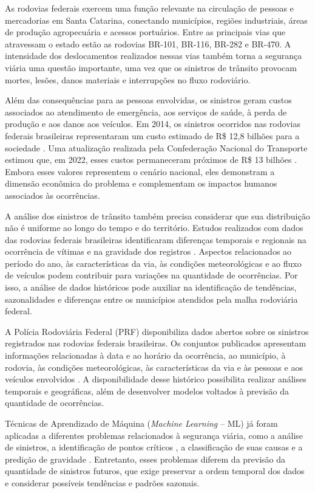 \documentclass[12pt]{article}
\begin{document}
As rodovias federais exercem uma função relevante na circulação de pessoas e mercadorias em Santa Catarina, conectando municípios, regiões industriais, áreas de produção agropecuária e acessos portuários. Entre as principais vias que atravessam o estado estão as rodovias BR-101, BR-116, BR-282 e BR-470. A intensidade dos deslocamentos realizados nessas vias também torna a segurança viária uma questão importante, uma vez que os sinistros de trânsito provocam mortes, lesões, danos materiais e interrupções no fluxo rodoviário.

Além das consequências para as pessoas envolvidas, os sinistros geram custos associados ao atendimento de emergência, aos serviços de saúde, à perda de produção e aos danos aos veículos. Em 2014, os sinistros ocorridos nas rodovias federais brasileiras representaram um custo estimado de R\$ 12,8 bilhões para a sociedade \cite{ipea2015acidentes}. Uma atualização realizada pela Confederação Nacional do Transporte estimou que, em 2022, esses custos permaneceram próximos de R\$ 13 bilhões \cite{cnt2023acidentes}. Embora esses valores representem o cenário nacional, eles demonstram a dimensão econômica do problema e complementam os impactos humanos associados às ocorrências.

A análise dos sinistros de trânsito também precisa considerar que sua distribuição não é uniforme ao longo do tempo e do território. Estudos realizados com dados das rodovias federais brasileiras identificaram diferenças temporais e regionais na ocorrência de vítimas e na gravidade dos registros \cite{moraisneto2021tendencia}. Aspectos relacionados ao período do ano, às características da via, às condições meteorológicas e ao fluxo de veículos podem contribuir para variações na quantidade de ocorrências. Por isso, a análise de dados históricos pode auxiliar na identificação de tendências, sazonalidades e diferenças entre os municípios atendidos pela malha rodoviária federal.

A Polícia Rodoviária Federal (PRF) disponibiliza dados abertos sobre os sinistros registrados nas rodovias federais brasileiras. Os conjuntos publicados apresentam informações relacionadas à data e ao horário da ocorrência, ao município, à rodovia, às condições meteorológicas, às características da via e às pessoas e aos veículos envolvidos \cite{prf2026dados}. A disponibilidade desse histórico possibilita realizar análises temporais e geográficas, além de desenvolver modelos voltados à previsão da quantidade de ocorrências.

Técnicas de Aprendizado de Máquina (\textit{Machine Learning} -- ML) já foram aplicadas a diferentes problemas relacionados à segurança viária, como a análise de sinistros, a identificação de pontos críticos \cite{santos2021machine}, a classificação de suas causas \cite{silva2024classificacao} e a predição de gravidade \cite{mafort2025tecnicas}. Entretanto, esses problemas diferem da previsão da quantidade de sinistros futuros, que exige preservar a ordem temporal dos dados e considerar possíveis tendências e padrões sazonais.
\end{document}
